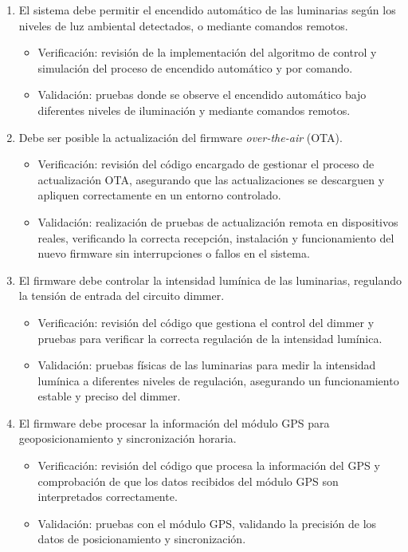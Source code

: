 \documentclass[
11pt, %
]{charter}
\begin{document}
\begin{enumerate}
\begin{enumerate}
			\item El sistema debe permitir el encendido automático de las luminarias según los niveles de luz ambiental detectados, o mediante comandos remotos.
				\begin{itemize}
				\item Verificación: revisión de la implementación del algoritmo de control y simulación del proceso de encendido automático y por comando.
				\item Validación: pruebas donde se observe el encendido automático bajo diferentes niveles de iluminación y mediante comandos remotos.
				\end{itemize}
			\item Debe ser posible la actualización del firmware \textit{over-the-air} (OTA).
				\begin{itemize}
				\item Verificación: revisión del código encargado de gestionar el proceso de actualización OTA, asegurando que las actualizaciones se descarguen y apliquen correctamente en un entorno controlado.
				\item Validación:  realización de pruebas de actualización remota en dispositivos reales, verificando la correcta recepción, instalación y funcionamiento del nuevo firmware sin interrupciones o fallos en el sistema. 
				\end{itemize}
			\item El firmware debe controlar la intensidad lumínica de las luminarias, regulando la tensión de entrada del circuito dimmer.
				\begin{itemize}
				\item Verificación:  revisión del código que gestiona el control del dimmer y pruebas para verificar la correcta regulación de la intensidad lumínica.
				\item Validación: pruebas físicas de las luminarias para medir la intensidad lumínica a diferentes niveles de regulación, asegurando un funcionamiento estable y preciso del dimmer. 
				\end{itemize}
			\item El firmware debe procesar la información del módulo GPS para geoposicionamiento y sincronización horaria.
				\begin{itemize}
				\item Verificación: revisión del código que procesa la información del GPS y comprobación de que los datos recibidos del módulo GPS son interpretados correctamente.
				\item Validación: pruebas con el módulo GPS, validando la precisión de los datos de posicionamiento y sincronización.

\end{itemize}
\end{enumerate}
\end{enumerate}
\end{document}
